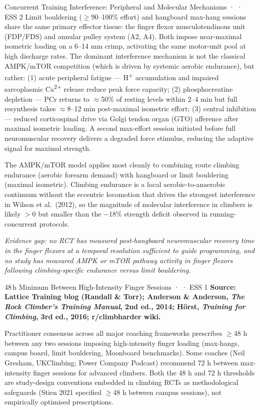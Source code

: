 \begin{bioplausbox}{Concurrent Training Interference: Peripheral and Molecular Mechanisms · \bioplausible · ESS 2}
Limit bouldering ($\geq$90–100\% effort) and hangboard max-hang sessions share the same primary effector tissue: the finger flexor musculotendinous unit (FDP/FDS) and annular pulley system (A2, A4). Both impose near-maximal isometric loading on a 6–14 mm crimp, activating the same motor-unit pool at high discharge rates. The dominant interference mechanism is not the classical AMPK/mTOR competition (which is driven by systemic aerobic endurance), but rather: (1) acute peripheral fatigue — H\textsuperscript{+} accumulation and impaired sarcoplasmic Ca\textsuperscript{2+} release reduce peak force capacity; (2) phosphocreatine depletion — PCr returns to $\approx$50\% of resting levels within 2–4 min but full resynthesis takes $\approx$8–12 min post-maximal isometric effort; (3) central inhibition — reduced corticospinal drive via Golgi tendon organ (GTO) afference after maximal isometric loading. A second max-effort session initiated before full neuromuscular recovery delivers a degraded force stimulus, reducing the adaptive signal for maximal strength.

The AMPK/mTOR model applies most cleanly to combining route climbing endurance (aerobic forearm demand) with hangboard or limit bouldering (maximal isometric). Climbing endurance is a local aerobic-to-anaerobic continuum without the eccentric locomotion that drives the strongest interference in Wilson et al.\ (2012), so the magnitude of molecular interference in climbers is likely $>0$ but smaller than the $-$18\% strength deficit observed in running-concurrent protocols.

\textit{Evidence gap: no RCT has measured post-hangboard neuromuscular recovery time in the finger flexors at a temporal resolution sufficient to guide programming, and no study has measured AMPK or mTOR pathway activity in finger flexors following climbing-specific endurance versus limit bouldering.}
\end{bioplausbox}

\begin{folklorebox}{48\,h Minimum Between High-Intensity Finger Sessions · \folkloreverified · ESS 1}
\textbf{Source: Lattice Training blog (Randall \& Torr); Anderson \& Anderson, \textit{The Rock Climber's Training Manual}, 2nd ed., 2014; Hörst, \textit{Training for Climbing}, 3rd ed., 2016; r/climbharder wiki.}

Practitioner consensus across all major coaching frameworks prescribes $\geq$48 h between any two sessions imposing high-intensity finger loading (max-hangs, campus board, limit bouldering, Moonboard benchmarks). Some coaches (Neil Gresham, UKClimbing; Power Company Podcast) recommend 72 h between max-intensity finger sessions for advanced climbers. Both the 48 h and 72 h thresholds are study-design conventions embedded in climbing RCTs as methodological safeguards (Stien 2021 specified $\geq$48 h between campus sessions), not empirically optimised prescriptions.
\end{folklorebox}

